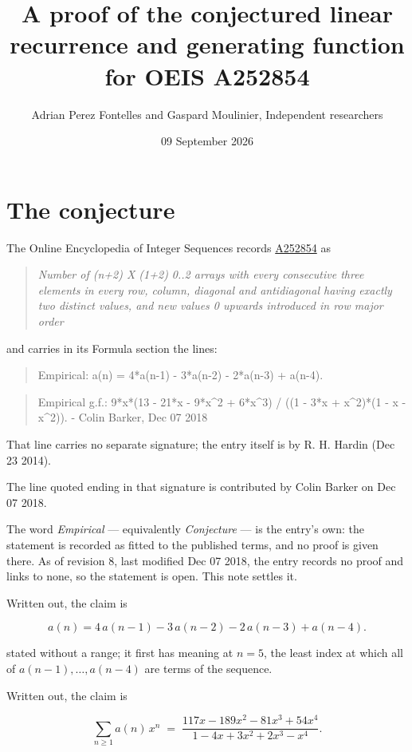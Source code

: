 \documentclass[11pt]{article}
\title{A proof of the conjectured linear recurrence and generating function for OEIS A252854}
\author{Adrian Perez Fontelles and Gaspard Moulinier, Independent researchers}
\date{09 September 2026}
\theoremstyle{definition}
\begin{document}
\maketitle
\section{The conjecture}

The Online Encyclopedia of Integer Sequences records \href{https://oeis.org/A252854}{A252854} as

\begin{quote}\itshape Number of (n+2) X (1+2) 0..2 arrays with every consecutive three elements in every row, column, diagonal and antidiagonal having exactly two distinct values, and new values 0 upwards introduced in row major order\end{quote}

and carries in its Formula section the lines:

\begin{quote}\ttfamily Empirical: a(n) = 4*a(n-1) - 3*a(n-2) - 2*a(n-3) + a(n-4).\end{quote}

\begin{quote}\ttfamily Empirical g.f.: 9*x*(13 - 21*x - 9*x\textasciicircum{}2 + 6*x\textasciicircum{}3) / ((1 - 3*x + x\textasciicircum{}2)*(1 - x - x\textasciicircum{}2)). - Colin Barker, Dec 07 2018\end{quote}

That line carries no separate signature; the entry itself is by R. H. Hardin (Dec 23 2014).

The line quoted ending in that signature is contributed by Colin Barker on Dec 07 2018.

The word {\itshape Empirical} --- equivalently {\itshape Conjecture} --- is the entry's own: the statement is recorded as fitted to the published terms, and no proof is given there. As of revision 8, last modified Dec 07 2018, the entry records no proof and links to none, so the statement is open. This note settles it.

Written out, the claim is

\[a(n) = 4\,a(n-1) - 3\,a(n-2) - 2\,a(n-3) + a(n-4).\]

stated without a range; it first has meaning at $n = 5$, the least index at which all of $a(n-1),\dots,a(n-4)$ are terms of the sequence.

Written out, the claim is

\[\sum_{n \ge 1} a(n)\,x^n \;=\; \frac{117x - 189x^{2} - 81x^{3} + 54x^{4}}{1 - 4x + 3x^{2} + 2x^{3} - x^{4}}.\]
\end{document}
